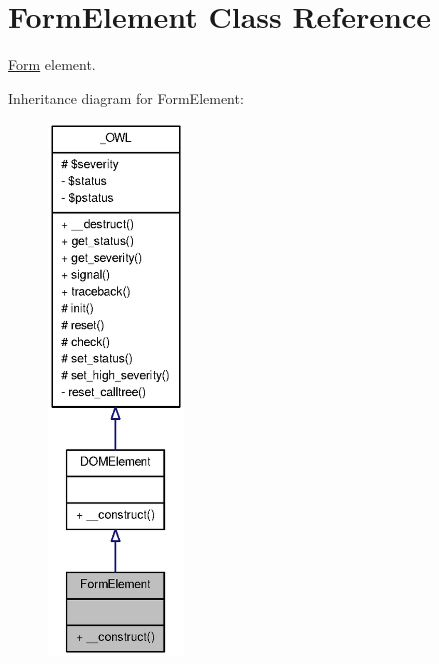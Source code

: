\section{FormElement Class Reference}
\label{classFormElement}


\hyperlink{classForm}{Form} element.  




Inheritance diagram for FormElement:\nopagebreak
\begin{figure}[H]
\begin{center}
\leavevmode
\includegraphics[height=400pt]{classFormElement__inherit__graph}
\end{center}
\end{figure}


